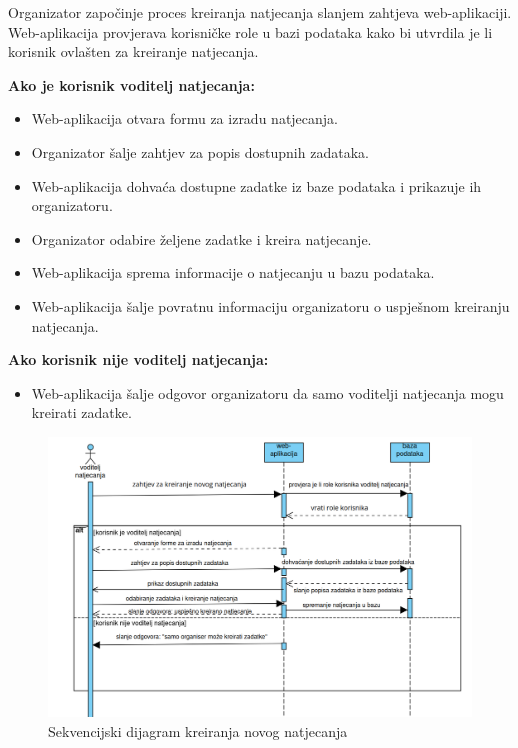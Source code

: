 \documentclass{article}
\begin{document}
Organizator započinje proces kreiranja natjecanja slanjem zahtjeva web-aplikaciji.
Web-aplikacija provjerava korisničke role u bazi podataka kako bi utvrdila je li korisnik ovlašten za kreiranje natjecanja.

\textbf{Ako je korisnik voditelj natjecanja:}
\begin{itemize}
  \item Web-aplikacija otvara formu za izradu natjecanja.
  \item Organizator šalje zahtjev za popis dostupnih zadataka.
  \item Web-aplikacija dohvaća dostupne zadatke iz baze podataka i prikazuje ih organizatoru.
  \item Organizator odabire željene zadatke i kreira natjecanje.
  \item Web-aplikacija sprema informacije o natjecanju u bazu podataka.
  \item Web-aplikacija šalje povratnu informaciju organizatoru o uspješnom kreiranju natjecanja.
\end{itemize}

\textbf{Ako korisnik nije voditelj natjecanja:}
\begin{itemize}
  \item Web-aplikacija šalje odgovor organizatoru da samo voditelji natjecanja mogu kreirati zadatke.
\end{itemize}


\begin{figure}[h!]
  \centering
  \includegraphics[width=\linewidth]{../slike/kreiranje_natjecanja.png}
  \caption{Sekvencijski dijagram kreiranja novog natjecanja}\label{fig:seqdiag}
\end{figure}
\end{document}
